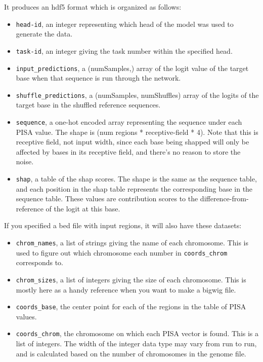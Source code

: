 \documentclass{article}
\begin{document}
It produces an hdf5 format which is organized as follows:

\begin{itemize}
    \item \texttt{head-id}, an integer representing which head of the model was
        used to generate the data.
    \item \texttt{task-id}, an integer giving the task number within the
        specified head.
    \item \texttt{input\_predictions}, a (numSamples,) array of the logit value
        of the target base when that sequence is run through the network.
    \item \texttt{shuffle\_predictions}, a (numSamples, numShuffles) array of
        the logits of the target base in the shuffled reference sequences.
    \item \texttt{sequence}, a one-hot encoded array representing the sequence
        under each PISA value.
        The shape is (num regions * receptive-field * 4).
        Note that this is receptive field, not input width, since each base
        being shapped will only be affected by bases in its receptive field,
        and there's no reason to store the noise.
    \item \texttt{shap}, a table of the shap scores.
        The shape is the same as the sequence table, and each position in the
        shap table represents the corresponding base in the sequence table.
        These values are contribution scores to the difference-from-reference
        of the logit at this base.

\end{itemize}

If you specified a bed file with input regions, it will also have these datasets:

\begin{itemize}
    \item \texttt{chrom\_names}, a list of strings giving the name of each
        chromosome.
        This is used to figure out which chromosome each number in
        \texttt{coords\_chrom} corresponds to.
    \item \texttt{chrom\_sizes}, a list of integers giving the size of each
        chromosome.
        This is mostly here as a handy reference when you want to make a bigwig
        file.
    \item \texttt{coords\_base}, the center point for each of the regions in the
        table of PISA values.
    \item \texttt{coords\_chrom}, the chromosome on which each PISA vector is
        found.
        This is a list of integers.
        The width of the integer data type may vary from run to run, and is
        calculated based on the number of chromosomes in the genome file.
\end{itemize}
\end{document}
